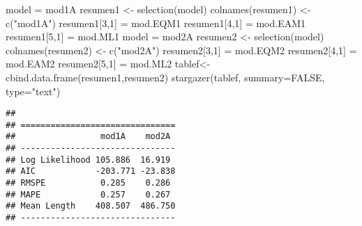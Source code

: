 \documentclass[
]{article}
\newenvironment{Shaded}{\begin{snugshade}}{\end{snugshade}}
\newcommand{\AttributeTok}[1]{\textcolor[rgb]{0.77,0.63,0.00}{#1}}
\newcommand{\ConstantTok}[1]{\textcolor[rgb]{0.00,0.00,0.00}{#1}}
\newcommand{\DecValTok}[1]{\textcolor[rgb]{0.00,0.00,0.81}{#1}}
\newcommand{\FunctionTok}[1]{\textcolor[rgb]{0.00,0.00,0.00}{#1}}
\newcommand{\NormalTok}[1]{#1}
\newcommand{\OtherTok}[1]{\textcolor[rgb]{0.56,0.35,0.01}{#1}}
\newcommand{\StringTok}[1]{\textcolor[rgb]{0.31,0.60,0.02}{#1}}
\begin{document}
\begin{Shaded}
\begin{Highlighting}[]
\NormalTok{model }\OtherTok{=}\NormalTok{ mod1A}
\NormalTok{resumen1 }\OtherTok{\textless{}{-}} \FunctionTok{selection}\NormalTok{(model)}
\FunctionTok{colnames}\NormalTok{(resumen1) }\OtherTok{\textless{}{-}} \FunctionTok{c}\NormalTok{(}\StringTok{"mod1A"}\NormalTok{)}
\NormalTok{resumen1[}\DecValTok{3}\NormalTok{,}\DecValTok{1}\NormalTok{] }\OtherTok{=}\NormalTok{ mod.EQM1}
\NormalTok{resumen1[}\DecValTok{4}\NormalTok{,}\DecValTok{1}\NormalTok{] }\OtherTok{=}\NormalTok{ mod.EAM1}
\NormalTok{resumen1[}\DecValTok{5}\NormalTok{,}\DecValTok{1}\NormalTok{] }\OtherTok{=}\NormalTok{ mod.ML1 }
\NormalTok{model }\OtherTok{=}\NormalTok{ mod2A}
\NormalTok{resumen2 }\OtherTok{\textless{}{-}} \FunctionTok{selection}\NormalTok{(model)}
\FunctionTok{colnames}\NormalTok{(resumen2) }\OtherTok{\textless{}{-}} \FunctionTok{c}\NormalTok{(}\StringTok{"mod2A"}\NormalTok{)}
\NormalTok{resumen2[}\DecValTok{3}\NormalTok{,}\DecValTok{1}\NormalTok{] }\OtherTok{=}\NormalTok{ mod.EQM2}
\NormalTok{resumen2[}\DecValTok{4}\NormalTok{,}\DecValTok{1}\NormalTok{] }\OtherTok{=}\NormalTok{ mod.EAM2}
\NormalTok{resumen2[}\DecValTok{5}\NormalTok{,}\DecValTok{1}\NormalTok{] }\OtherTok{=}\NormalTok{ mod.ML2}
\NormalTok{tablef}\OtherTok{\textless{}{-}}\FunctionTok{cbind.data.frame}\NormalTok{(resumen1,resumen2)}
\FunctionTok{stargazer}\NormalTok{(tablef, }\AttributeTok{summary=}\ConstantTok{FALSE}\NormalTok{, }\AttributeTok{type=}\StringTok{"text"}\NormalTok{)}
\end{Highlighting}
\end{Shaded}

\begin{verbatim}
## 
## ===============================
##                 mod1A    mod2A 
## -------------------------------
## Log Likelihood 105.886  16.919 
## AIC            -203.771 -23.838
## RMSPE           0.285    0.286 
## MAPE            0.257    0.267 
## Mean Length    408.507  486.750
## -------------------------------
\end{verbatim}
\end{document}
